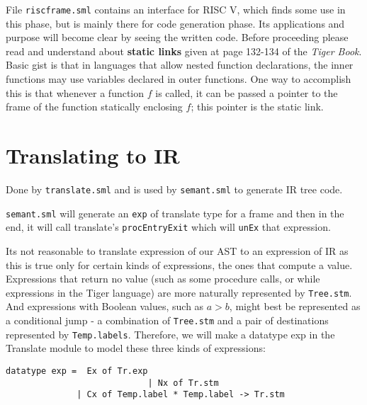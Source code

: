 
File \texttt{riscframe.sml} contains an interface for RISC V, which finds some use in this phase, but is mainly there for code generation phase. Its applications and purpose will become clear by seeing the written code. Before proceeding please read and understand about \textbf{static links} given at page 132-134 of the \textit{Tiger Book}. Basic gist is that in languages that allow nested function declarations, the inner functions may use variables declared in outer functions. One way to accomplish this is that whenever a function $f$ is called, it can be passed a pointer to the frame of the function statically enclosing $f$; this pointer is the static link. 

\section{Translating to IR}


Done by \texttt{translate.sml} and is used by \texttt{semant.sml} to generate IR tree code. 

\texttt{semant.sml} will generate an \texttt{exp} of translate type for a frame and then in the end, it will call translate's \texttt{procEntryExit} which will \texttt{unEx} that expression.


Its not reasonable to translate expression of our AST to an expression of IR as this is true only for certain kinds of expressions, the ones that  compute a value. Expressions that return no value (such as some procedure calls, or while expressions in the Tiger language) are more naturally represented by \texttt{Tree.stm}. And expressions with Boolean values, such as $a > b$, might best be represented as a conditional jump - a combination of \texttt{Tree.stm} and a pair of destinations represented by \texttt{Temp.labels}. Therefore, we will make a datatype exp in the Translate module to model these three kinds of expressions:

\begin{verbatim}
datatype exp =  Ex of Tr.exp
							| Nx of Tr.stm
              | Cx of Temp.label * Temp.label -> Tr.stm
\end{verbatim}

